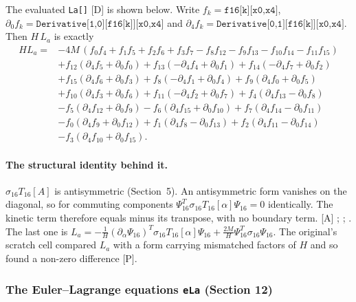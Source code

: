 The evaluated \texttt{La[]} [D] is shown below. Write $f_k=\texttt{f16[k][x0,x4]}$,
$\partial_0 f_k=\texttt{Derivative[1,0][f16[k]][x0,x4]}$ and
$\partial_4 f_k=\texttt{Derivative[0,1][f16[k]][x0,x4]}$. Then $H\,L_a$ is exactly
\begin{align*}
H L_a ={}& -4M\,(f_0f_4+f_1f_5+f_2f_6+f_3f_7-f_8f_{12}-f_9f_{13}-f_{10}f_{14}-f_{11}f_{15})\\
&+f_{12}(\partial_4f_5+\partial_0f_0)+f_{13}(-\partial_4f_4+\partial_0f_1)+f_{14}(-\partial_4f_7+\partial_0f_2)\\
&+f_{15}(\partial_4f_6+\partial_0f_3)+f_{8}(-\partial_4f_1+\partial_0f_4)+f_{9}(\partial_4f_0+\partial_0f_5)\\
&+f_{10}(\partial_4f_3+\partial_0f_6)+f_{11}(-\partial_4f_2+\partial_0f_7)+f_{4}(\partial_4f_{13}-\partial_0f_8)\\
&-f_{5}(\partial_4f_{12}+\partial_0f_9)-f_{6}(\partial_4f_{15}+\partial_0f_{10})+f_{7}(\partial_4f_{14}-\partial_0f_{11})\\
&-f_{0}(\partial_4f_9+\partial_0f_{12})+f_{1}(\partial_4f_8-\partial_0f_{13})+f_{2}(\partial_4f_{11}-\partial_0f_{14})\\
&-f_{3}(\partial_4f_{10}+\partial_0f_{15}).
\end{align*}

\paragraph{The structural identity behind it.} $\sigma_{16}T_{16}[A]$ is antisymmetric
(Section~5). An antisymmetric form vanishes on the diagonal, so for commuting components
$\Psi_{16}^{T}\sigma_{16}T_{16}[\alpha]\Psi_{16}=0$ identically. The kinetic term therefore equals
minus its transpose, with no boundary term. [A]
;
;
. The last one is
$L_a = -\tfrac1H(\partial_\alpha\Psi_{16})^{T}\sigma_{16}T_{16}[\alpha]\Psi_{16}
+\tfrac{2M}{H}\Psi_{16}^{T}\sigma_{16}\Psi_{16}$. The original's scratch cell compared $L_a$ with a
form carrying mismatched factors of $H$ and so found a non-zero difference [P].

\subsubsection{The Euler--Lagrange equations \texttt{eLa} (Section 12)}
\label{fnd:eLa}\label{sec:3.1.8}

